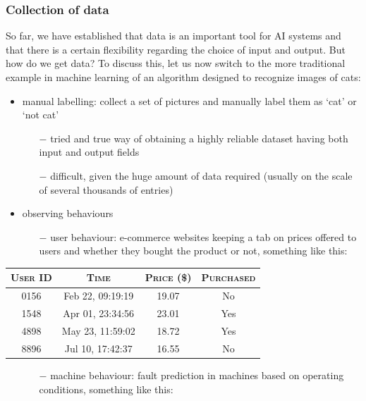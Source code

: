 \documentclass{article}[a4paper,12pt]
\theoremstyle{definition}
\begin{document}
\subsubsection{Collection of data}
So far, we have established that data is an important tool for AI systems and that there is a certain flexibility regarding the choice of input and output. But how do we get data? To discuss this, let us now switch to the more traditional example in machine learning of an algorithm designed to recognize images of cats:
\begin{itemize}
	\item manual labelling: collect a set of pictures and manually label them as `cat' or `not cat'
	\begin{itemize}
		\item[$-$] tried and true way of obtaining a highly reliable dataset having both input and output fields
		\item[$-$] difficult, given the huge amount of data required (usually on the scale of several thousands of entries)
	\end{itemize}
	\item observing behaviours
	\begin{itemize}
		\item[$-$] user behaviour: e-commerce websites keeping a tab on prices offered to users and whether they bought the product or not, something like this:
	\end{itemize}
\end{itemize}
\begin{center}
\begin{tabular}{|c|c|c|c|}
\hline
\textsc{User ID} & \textsc{Time} & \textsc{Price} (\$) & \textsc{Purchased}\\
\hline
0156 & Feb 22, 09:19:19 & 19.07 & No\\
\hline
1548 & Apr 01, 23:34:56 & 23.01 & Yes\\
\hline
4898 & May 23, 11:59:02 & 18.72 & Yes\\
\hline
8896 & Jul 10, 17:42:37 & 16.55 & No\\
\hline
\end{tabular}
\end{center}
\begin{itemize}
	\item[]
	\begin{itemize}
		\item[$-$] machine behaviour:  fault prediction in machines based on operating conditions, something like this:
	\end{itemize}
\end{itemize}
\end{document}
